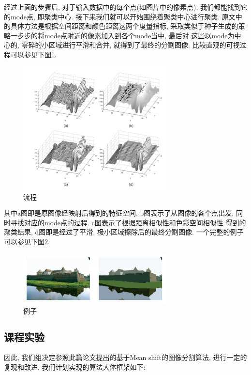 \documentclass[a4paper, 11pt]{article}
\begin{document}
经过上面的步骤后, 对于输入数据中的每个点(如图片中的像素点), 我们都能找到它的mode点, 即聚类中心. 接下来我们就可以开始围绕着聚类中心进行聚类.
原文中的具体方法是根据空间距离和颜色距离这两个度量指标, 采取类似于种子生成的策略一步步的将mode点附近的像素加入到各个mode当中, 最后对
这些以mode为中心的, 零碎的小区域进行平滑和合并, 就得到了最终的分割图像. 比较直观的可视过程可以参见下图\ref{fig:process}.

\begin{figure}[!htb]    
    \centering
\includegraphics[width=0.7\textwidth]{images/pro.png}
\caption{流程}
\label{fig:process}
\end{figure}

其中a图即是原图像经映射后得到的特征空间, b图表示了从图像的各个点出发, 同时寻找对应的mode点的过程. c图表示了根据距离相似性和色彩空间相似性
得到的聚类结果, d图即是经过了平滑, 极小区域擦除后的最终分割图像. 一个完整的例子可以参见下图\ref{fig:example}.

\begin{figure}[!htb]  
    \centering
\includegraphics[width=0.7\textwidth]{images/example.png}
\caption{例子}
\label{fig:example}
\end{figure}

\subsection{课程实验}
因此, 我们组决定参照此篇论文提出的基于Mean shift的图像分割算法, 进行一定的复现和改进. 我们计划实现的算法大体框架如下:
\end{document}

